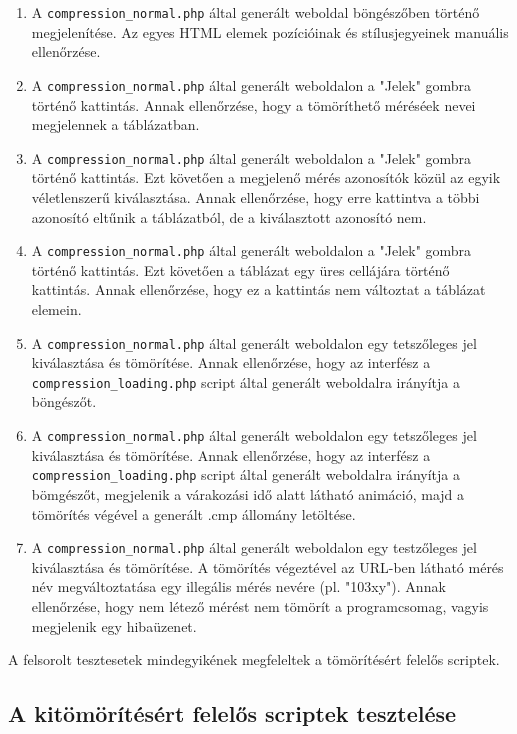 \documentclass[oneside,titlepage,12pt,a4paper]{report}
\begin{document}
\begin{enumerate}
\item A \texttt{compression\_normal.php} által generált weboldal böngészőben történő megjelenítése. Az egyes HTML elemek pozícióinak és stílusjegyeinek manuális ellenőrzése.
\item A \texttt{compression\_normal.php} által generált weboldalon a "Jelek" gombra történő kattintás. Annak ellenőrzése, hogy a tömöríthető méréséek nevei megjelennek a táblázatban.
\item A \texttt{compression\_normal.php} által generált weboldalon a "Jelek" gombra történő kattintás. Ezt követően a megjelenő mérés azonosítók közül az egyik véletlenszerű kiválasztása. Annak ellenőrzése, hogy erre kattintva a többi azonosító eltűnik a táblázatból, de a kiválasztott azonosító nem.
\item A \texttt{compression\_normal.php} által generált weboldalon a "Jelek" gombra történő kattintás. Ezt követően a táblázat egy üres cellájára történő kattintás. Annak ellenőrzése, hogy ez a kattintás nem változtat a táblázat elemein.
\item A \texttt{compression\_normal.php} által generált weboldalon egy tetszőleges jel kiválasztása és tömörítése. Annak ellenőrzése, hogy az interfész a \texttt{compression\_loading.php} script által generált weboldalra irányítja a böngészőt.

\item A \texttt{compression\_normal.php} által generált weboldalon egy tetszőleges jel kiválasztása és tömörítése. Annak ellenőrzése, hogy az interfész a \texttt{compression\_loading.php} script által generált weboldalra irányítja a bömgészőt, megjelenik a várakozási idő alatt látható animáció, majd a tömörítés végével a generált .cmp állomány letöltése. 

\item A \texttt{compression\_normal.php} által generált weboldalon egy testzőleges jel kiválasztása és tömörítése. A tömörítés végeztével az URL-ben látható mérés név megváltoztatása egy illegális mérés nevére (pl. "103xy"). Annak ellenőrzése, hogy nem létező mérést nem tömörít a programcsomag, vagyis megjelenik egy hibaüzenet.

\end{enumerate}

A felsorolt tesztesetek mindegyikének megfeleltek a tömörítésért felelős scriptek.


\subsection{A kitömörítésért felelős scriptek tesztelése}
\end{document}
